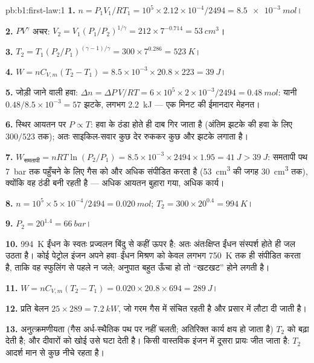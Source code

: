 \begin{solution}{pb:b1:first-law:1}
\textbf{1.} $n = P_1V_1/RT_1 = 10^5 \times 2.12\times10^{-4}/2494 = \qty{8.5e-3}{mol}$।

\textbf{2.} $PV^\gamma$ अचर: $V_2 = V_1(P_1/P_2)^{1/\gamma} = 212 \times
7^{-0.714} = \qty{53}{cm^3}$।

\textbf{3.} $T_2 = T_1(P_2/P_1)^{(\gamma - 1)/\gamma} = 300 \times 7^{0.286} =
\qty{523}{K}$।

\textbf{4.} $W = nC_{V,m}(T_2 - T_1) = 8.5\times10^{-3} \times 20.8 \times 223 =
\qty{39}{J}$।

\textbf{5.} जोड़ी जाने वाली हवा: $\Delta n = \Delta P\,V/RT = 6\times10^5 \times 2\times10^{-3}/
2494 = \qty{0.48}{mol}$: यानी $0.48/8.5\times10^{-3} = 57$ झटके, लगभग
\qty{2.2}{kJ} --- एक मिनट की ईमानदार मेहनत।

\textbf{6.} स्थिर आयतन पर $P \propto T$: हवा के ठंडा होते ही दाब गिर जाता
है (अंतिम झटके की हवा के लिए $300/523$ तक); अतः साइकिल-सवार कुछ देर रुककर
कुछ और झटके लगाता है।

\textbf{7.} $W_{\text{समतापी}} = nRT\ln(P_2/P_1) = 8.5\times10^{-3} \times 2494 \times
1.95 = \qty{41}{J} > \qty{39}{J}$: समतापी पथ \qty{7}{bar} तक पहुँचने के लिए
गैस को और अधिक संपीडित करता है (\qty{53}{cm^3} की जगह \qty{30}{cm^3} तक),
क्योंकि वह ठंडी बनी रहती है --- अधिक आयतन बुहारा गया, अधिक कार्य।

\textbf{8.} $n = 10^5 \times 5\times10^{-4}/2494 = \qty{0.020}{mol}$; $T_2 =
300 \times 20^{0.4} = \qty{994}{K}$।

\textbf{9.} $P_2 = 20^{1.4} = \qty{66}{bar}$।

\textbf{10.} \qty{994}{K} ईंधन के स्वतः प्रज्वलन बिंदु से कहीं ऊपर है: अतः
अंतःक्षिप्त ईंधन संस्पर्श होते ही जल उठता है। कोई पेट्रोल इंजन अपने
हवा--ईंधन मिश्रण को केवल लगभग \qty{750}{K} तक ही संपीडित करता है, ताकि वह
स्फुलिंग से पहले न जले; अनुपात बहुत ऊँचा हो तो ``खटखट'' होने लगती है।

\textbf{11.} $W = nC_{V,m}(T_2 - T_1) = 0.020 \times 20.8 \times 694 = \qty{289}{J}$।

\textbf{12.} प्रति बेलन $25 \times 289 = \qty{7.2}{kW}$, जो गरम गैस में संचित
रहती है और प्रसार में लौटा दी जाती है।

\textbf{13.} अनुत्क्रमणीयता (गैस अर्ध-स्थैतिक पथ पर नहीं चलती; अतिरिक्त
कार्य क्षय हो जाता है) $T_2$ को बढ़ा देती है; और दीवारों को खोई  उसे
घटा देती है। किसी वास्तविक इंजन में दूसरा प्रायः जीत जाता है: $T_2$ आदर्श
मान से कुछ नीचे रहता है।


\end{solution}
